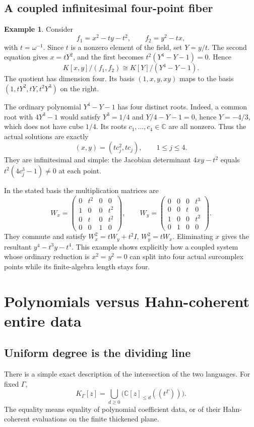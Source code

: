 \documentclass[11pt,letterpaper]{article}
\numberwithin{equation}{section}
\theoremstyle{definition}
\newtheorem{example}[theorem]{Example}
\theoremstyle{remark}\newtheorem{remark}[theorem]{Remark}
\newcommand{\C}{\mathbb C}
\begin{document}
\subsection{A coupled infinitesimal four-point fiber}
\begin{example}\label{ex:coupled}
Consider
\[
 f_1=x^2-ty-t^2,\qquad f_2=y^2-tx,
\]
with $t=\omega^{-1}$. Since $t$ is a nonzero element of the field,
set $Y=y/t$. The second equation gives $x=tY^2$, and the first becomes
$t^2(Y^4-Y-1)=0$. Hence
\begin{equation}\label{eq:couplediso}
 K[x,y]/(f_1,f_2)\cong K[Y]/(Y^4-Y-1).
\end{equation}
The quotient has dimension four. Its basis $(1,x,y,xy)$ maps to
the basis $(1,tY^2,tY,t^2Y^3)$ on the right.

The ordinary polynomial $Y^4-Y-1$ has four distinct roots. Indeed,
a common root with $4Y^3-1$ would satisfy $Y^3=1/4$ and
$Y/4-Y-1=0$, hence $Y=-4/3$, which does not have cube $1/4$.
Its roots $c_1,\ldots,c_4\in\C$ are all nonzero. Thus the actual
solutions are exactly
\[
 (x,y)=(tc_j^2,tc_j),\qquad 1\le j\le4.
\]
They are infinitesimal and simple: the Jacobian determinant
$4xy-t^2$ equals $t^2(4c_j^3-1)\ne0$ at each point.

In the stated basis the multiplication matrices are
\[
 W_x=\begin{pmatrix}
 0&t^2&0&0\\1&0&0&t^2\\0&t&0&t^2\\0&0&1&0
 \end{pmatrix},\qquad
 W_y=\begin{pmatrix}
 0&0&0&t^3\\0&0&t&0\\1&0&0&t^2\\0&1&0&0
 \end{pmatrix}.
\]
They commute and satisfy
$W_x^2=tW_y+t^2I$, $W_y^2=tW_x$.
Eliminating $x$ gives the resultant
$y^4-t^3y-t^4$. This example shows explicitly how a coupled system
whose ordinary reduction is $x^2=y^2=0$ can split into four actual
surcomplex points while its finite-algebra length stays four.
\end{example}

\section{Polynomials versus Hahn-coherent entire data}\label{sec:comparison}

\subsection{Uniform degree is the dividing line}
There is a simple exact description of the intersection of the two
languages. For fixed $\Gamma$,
\begin{equation}\label{eq:uniformdegree}
 K_\Gamma[z]
 =\bigcup_{d\ge0}\bigl(\C[z]_{\le d}((t^\Gamma))\bigr).
\end{equation}
The equality means equality of polynomial coefficient data, or of their
Hahn-coherent evaluations on the finite thickened plane.
\end{document}

